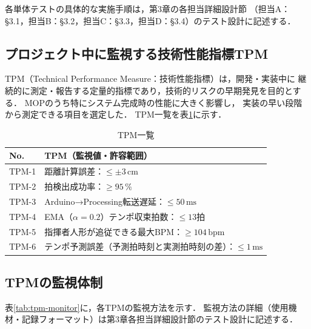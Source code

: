 各単体テストの具体的な実施手順は，第3章の各担当詳細設計節
（担当A：§3.1，担当B：§3.2，担当C：§3.3，担当D：§3.4）のテスト設計に記述する．

\subsection{プロジェクト中に監視する技術性能指標TPM}

TPM（Technical Performance Measure：技術性能指標）は，開発・実装中に
継続的に測定・報告する定量的指標であり，技術的リスクの早期発見を目的とする．
MOPのうち特にシステム完成時の性能に大きく影響し，
実装の早い段階から測定できる項目を選定した．
TPM一覧を表\ref{tab:tpm}に示す．

\begin{table}[H]
  \centering
  \caption{TPM一覧}
  \label{tab:tpm}
  \begin{tabularx}{\linewidth}{lX}
    \toprule
    No. & TPM（監視値・許容範囲） \\
    \midrule
    TPM-1 & 距離計算誤差：$\leq \pm 3\,\mathrm{cm}$ \\
    TPM-2 & 拍検出成功率：$\geq 95\,\%$ \\
    TPM-3 & Arduino→Processing転送遅延：$\leq 50\,\mathrm{ms}$ \\
    TPM-4 & EMA（$\alpha=0.2$）テンポ収束拍数：$\leq 13$拍 \\
    TPM-5 & 指揮者人形が追従できる最大BPM：$\geq 104\,\mathrm{bpm}$ \\
    TPM-6 & テンポ予測誤差（予測拍時刻と実測拍時刻の差）：$\leq 1\,\mathrm{ms}$ \\
    \bottomrule
  \end{tabularx}
\end{table}

\subsection{TPMの監視体制}

表\ref{tab:tpm-monitor}に，各TPMの監視方法を示す．
監視方法の詳細（使用機材・記録フォーマット）は第3章各担当詳細設計節のテスト設計に記述する．

